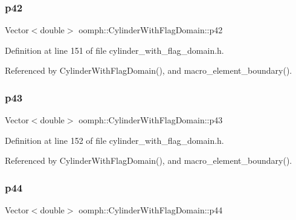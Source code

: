\subsubsection{\texorpdfstring{p42}{p42}}
{\footnotesize\ttfamily Vector$<$double$>$ oomph\+::\+Cylinder\+With\+Flag\+Domain\+::p42\hspace{0.3cm}{\ttfamily [private]}}



Definition at line 151 of file cylinder\+\_\+with\+\_\+flag\+\_\+domain.\+h.



Referenced by Cylinder\+With\+Flag\+Domain(), and macro\+\_\+element\+\_\+boundary().

\mbox{\label{classoomph_1_1CylinderWithFlagDomain_a4cf79435459ac5399f94f6e0686e5a0a}} 
\subsubsection{\texorpdfstring{p43}{p43}}
{\footnotesize\ttfamily Vector$<$double$>$ oomph\+::\+Cylinder\+With\+Flag\+Domain\+::p43\hspace{0.3cm}{\ttfamily [private]}}



Definition at line 152 of file cylinder\+\_\+with\+\_\+flag\+\_\+domain.\+h.



Referenced by Cylinder\+With\+Flag\+Domain(), and macro\+\_\+element\+\_\+boundary().

\mbox{\label{classoomph_1_1CylinderWithFlagDomain_a4288652a4436b747a86ff94346c61ebc}} 
\subsubsection{\texorpdfstring{p44}{p44}}
{\footnotesize\ttfamily Vector$<$double$>$ oomph\+::\+Cylinder\+With\+Flag\+Domain\+::p44\hspace{0.3cm}{\ttfamily [private]}}



